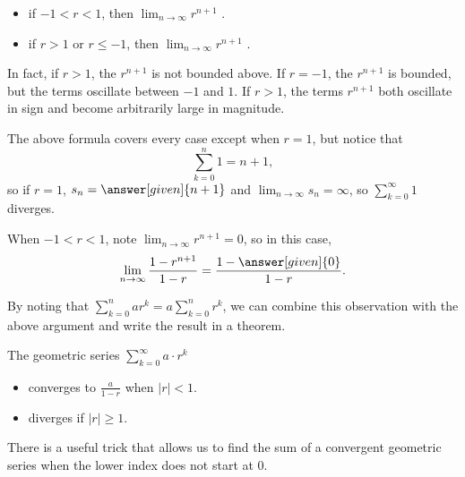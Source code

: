 \documentclass{ximera}
\begin{document}
\begin{itemize}
\item if $-1<r<1$, then $\lim_{n \to \infty} r^{n+1}$ .
\item if $r>1$ or $r\le -1$, then $\lim_{n \to \infty} r^{n+1}$ .
\end{itemize}

In fact, if $r>1$, the $r^{n+1}$ is not bounded above.  If $r=-1$, the $r^{n+1}$ is bounded, but the terms oscillate between $-1$ and $1$.  If $r>1$, the terms $r^{n+1}$ both oscillate in sign and become arbitrarily large in magnitude.

The above formula covers every case except when $r= 1$, but notice that  $$\sum_{k=0}^n 1 = n+1,$$ so if $r=1$, $s_n = \answer[given]{n+1}$ and $\lim_{n \to \infty} s_n = \infty$, so $\sum_{k=0}^{\infty} 1$ diverges. 

When $-1<r<1$, note $\lim_{n \to \infty} r^{n+1}=0$, so in this case,     \[
    \lim_{n\to\infty}\frac{1 - r^{n+1}}{1-r} = \frac{1-\answer[given]{0}}{1-r}.
    \]

By noting that $\sum_{k=0}^n ar^k = a \sum_{k=0}^n r^k$, we can combine this observation with the above argument and write the result in a theorem.

\begin{theorem}
  The geometric series $\sum_{k= 0}^\infty a \cdot r^k$ 
  
  \begin{itemize} 
  \item converges to $\frac{a}{1-r}$ when $|r| < 1$.
  \item diverges if $|r| \geq 1$.  
  \end{itemize}
  \end{theorem}

There is a useful trick that allows us to find the sum of a convergent geometric series when the lower index does not start at $0$.  
\end{document}

